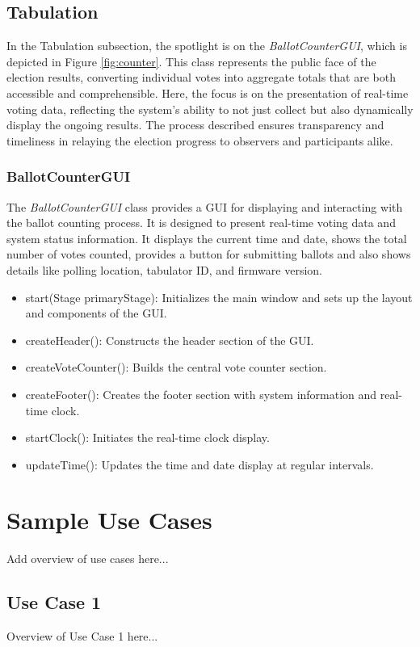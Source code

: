 \documentclass{article}
\begin{document}
\subsection{Tabulation}
In the Tabulation subsection, the spotlight is on the \textit{BallotCounterGUI}, which is depicted in Figure \ref{fig:counter}. This class represents the public face of the election results, converting individual votes into aggregate totals that are both accessible and comprehensible. Here, the focus is on the presentation of real-time voting data, reflecting the system's ability to not just collect but also dynamically display the ongoing results. The process described ensures transparency and timeliness in relaying the election progress to observers and participants alike.

\subsubsection{BallotCounterGUI}
The \textit{BallotCounterGUI} class provides a GUI for displaying and interacting with the ballot counting process. It is designed to present real-time voting data and system status information. It displays the current time and date, shows the total number of votes counted, provides a button for submitting ballots and also shows details like polling location, tabulator ID, and firmware version.

\begin{itemize}
    \item start(Stage primaryStage): Initializes the main window and sets up the layout and components of the GUI.
    \item createHeader(): Constructs the header section of the GUI.
    \item createVoteCounter(): Builds the central vote counter section.
    \item createFooter(): Creates the footer section with system information and real-time clock.
    \item startClock(): Initiates the real-time clock display.
    \item updateTime(): Updates the time and date display at regular intervals.
\end{itemize}

\section{Sample Use Cases}
Add overview of use cases here...

\subsection{Use Case 1}
Overview of Use Case 1 here...
\end{document}

